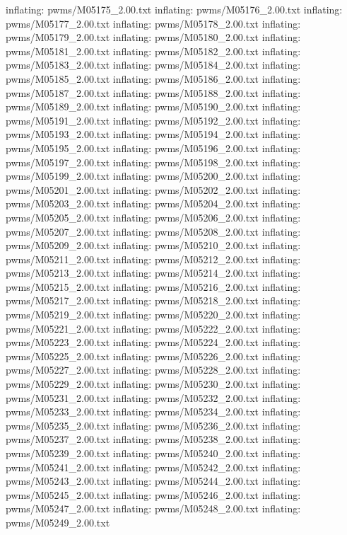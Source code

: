 \documentclass[letterpaper,10pt,english]{sphinxmanual}
\begin{document}
{\begin{sphinxVerbatim}[commandchars=\\\{\}]
  inflating: pwms/M05175\_2.00.txt
  inflating: pwms/M05176\_2.00.txt
  inflating: pwms/M05177\_2.00.txt
  inflating: pwms/M05178\_2.00.txt
  inflating: pwms/M05179\_2.00.txt
  inflating: pwms/M05180\_2.00.txt
  inflating: pwms/M05181\_2.00.txt
  inflating: pwms/M05182\_2.00.txt
  inflating: pwms/M05183\_2.00.txt
  inflating: pwms/M05184\_2.00.txt
  inflating: pwms/M05185\_2.00.txt
  inflating: pwms/M05186\_2.00.txt
  inflating: pwms/M05187\_2.00.txt
  inflating: pwms/M05188\_2.00.txt
  inflating: pwms/M05189\_2.00.txt
  inflating: pwms/M05190\_2.00.txt
  inflating: pwms/M05191\_2.00.txt
  inflating: pwms/M05192\_2.00.txt
  inflating: pwms/M05193\_2.00.txt
  inflating: pwms/M05194\_2.00.txt
  inflating: pwms/M05195\_2.00.txt
  inflating: pwms/M05196\_2.00.txt
  inflating: pwms/M05197\_2.00.txt
  inflating: pwms/M05198\_2.00.txt
  inflating: pwms/M05199\_2.00.txt
  inflating: pwms/M05200\_2.00.txt
  inflating: pwms/M05201\_2.00.txt
  inflating: pwms/M05202\_2.00.txt
  inflating: pwms/M05203\_2.00.txt
  inflating: pwms/M05204\_2.00.txt
  inflating: pwms/M05205\_2.00.txt
  inflating: pwms/M05206\_2.00.txt
  inflating: pwms/M05207\_2.00.txt
  inflating: pwms/M05208\_2.00.txt
  inflating: pwms/M05209\_2.00.txt
  inflating: pwms/M05210\_2.00.txt
  inflating: pwms/M05211\_2.00.txt
  inflating: pwms/M05212\_2.00.txt
  inflating: pwms/M05213\_2.00.txt
  inflating: pwms/M05214\_2.00.txt
  inflating: pwms/M05215\_2.00.txt
  inflating: pwms/M05216\_2.00.txt
  inflating: pwms/M05217\_2.00.txt
  inflating: pwms/M05218\_2.00.txt
  inflating: pwms/M05219\_2.00.txt
  inflating: pwms/M05220\_2.00.txt
  inflating: pwms/M05221\_2.00.txt
  inflating: pwms/M05222\_2.00.txt
  inflating: pwms/M05223\_2.00.txt
  inflating: pwms/M05224\_2.00.txt
  inflating: pwms/M05225\_2.00.txt
  inflating: pwms/M05226\_2.00.txt
  inflating: pwms/M05227\_2.00.txt
  inflating: pwms/M05228\_2.00.txt
  inflating: pwms/M05229\_2.00.txt
  inflating: pwms/M05230\_2.00.txt
  inflating: pwms/M05231\_2.00.txt
  inflating: pwms/M05232\_2.00.txt
  inflating: pwms/M05233\_2.00.txt
  inflating: pwms/M05234\_2.00.txt
  inflating: pwms/M05235\_2.00.txt
  inflating: pwms/M05236\_2.00.txt
  inflating: pwms/M05237\_2.00.txt
  inflating: pwms/M05238\_2.00.txt
  inflating: pwms/M05239\_2.00.txt
  inflating: pwms/M05240\_2.00.txt
  inflating: pwms/M05241\_2.00.txt
  inflating: pwms/M05242\_2.00.txt
  inflating: pwms/M05243\_2.00.txt
  inflating: pwms/M05244\_2.00.txt
  inflating: pwms/M05245\_2.00.txt
  inflating: pwms/M05246\_2.00.txt
  inflating: pwms/M05247\_2.00.txt
  inflating: pwms/M05248\_2.00.txt
  inflating: pwms/M05249\_2.00.txt

\end{sphinxVerbatim}}
\end{document}
